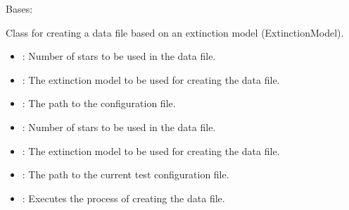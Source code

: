 \documentclass[letterpaper,10pt,english]{sphinxmanual}
\begin{document}
\begin{fulllineitems}
\label{\detokenize{CreateDataFile:CreateDataFile.CreateDataFile}}
\pysigstartsignatures
{}
\pysigstopsignatures
\sphinxAtStartPar
Bases: 

\sphinxAtStartPar
Class for creating a data file based on an extinction model (ExtinctionModel).
\begin{description}
\begin{itemize}
\item {} 
\sphinxAtStartPar
{}: Number of stars to be used in the data file.

\item {} 
\sphinxAtStartPar
{}: The extinction model to be used for creating the data file.

\item {} 
\sphinxAtStartPar
{}: The path to the configuration file.

\end{itemize}

\begin{itemize}
\item {} 
\sphinxAtStartPar
{}: Number of stars to be used in the data file.

\item {} 
\sphinxAtStartPar
{}: The extinction model to be used for creating the data file.

\item {} 
\sphinxAtStartPar
{}: The path to the current test configuration file.

\end{itemize}

\begin{itemize}
\item {} 
\sphinxAtStartPar
{}: Executes the process of creating the data file.

\end{itemize}


\end{description}
\end{fulllineitems}
\end{document}
